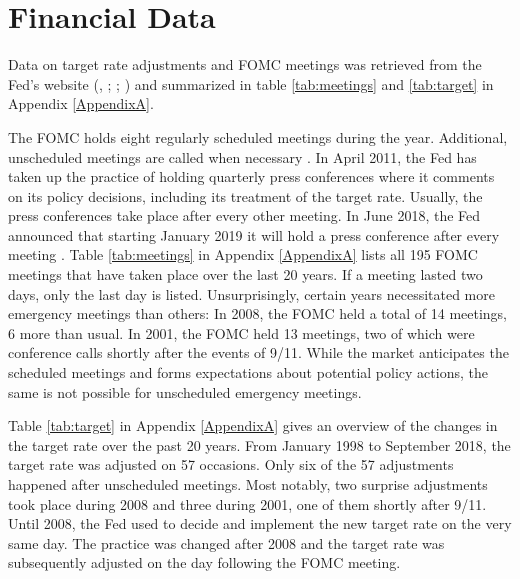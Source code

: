 \documentclass[11pt,a4paper,english,oneside]{book}
\numberwithin{equation}{chapter}
\begin{document}
\section{Financial Data}

Data on target rate adjustments and FOMC meetings was retrieved from the Fed's website (\citealp{FRS.2018}, \citeyear{FRS.2013}; \citealp{FOMC.2018Archive}; \citeyear{FOMC.2018}) and summarized in table \ref{tab:meetings} and \ref{tab:target} in Appendix \ref{AppendixA}. 

The FOMC holds eight regularly scheduled meetings during the year. Additional, unscheduled meetings are called when necessary \citep{FOMC.2018}. In April 2011, the Fed has taken up the practice of holding quarterly press conferences where it comments on its policy decisions, including its treatment of the target rate. Usually, the press conferences take place after every other meeting. In June 2018, the Fed announced that starting January 2019 it will hold a press conference after every meeting \citep{PressConference.2018}. Table \ref{tab:meetings} in Appendix \ref{AppendixA} lists all 195 FOMC meetings that have taken place over the last 20 years. If a meeting lasted two days, only the last day is listed. Unsurprisingly, certain years necessitated more emergency meetings than others: In 2008, the FOMC held a total of 14 meetings, 6 more than usual. In 2001, the FOMC held 13 meetings, two of which were conference calls shortly after the events of 9/11. While the market anticipates the scheduled meetings and forms expectations about potential policy actions, the same is not possible for unscheduled emergency meetings. 

Table \ref{tab:target} in Appendix \ref{AppendixA} gives an overview of the changes in the target rate over the past 20 years. From January 1998 to September 2018, the target rate was adjusted on 57 occasions. Only six of the 57 adjustments happened after unscheduled meetings. Most notably, two surprise adjustments took place during 2008 and three during 2001, one of them shortly after 9/11. Until 2008, the Fed used to decide and implement the new target rate on the very same day. The practice was changed after 2008 and the target rate was subsequently adjusted on the day following the FOMC meeting. 
\end{document}
